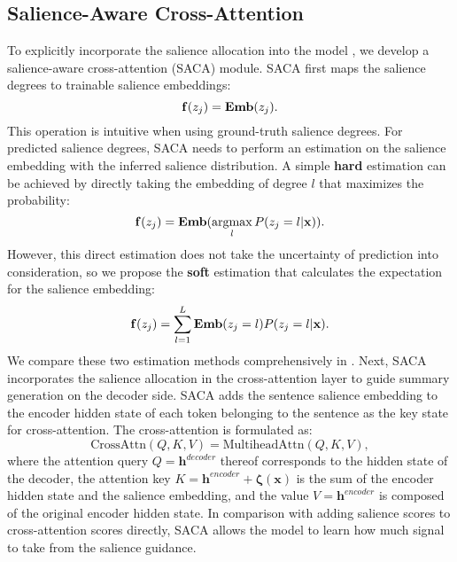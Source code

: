 \documentclass[11pt]{article}
\DeclareMathOperator*{\argmax}{argmax} \usepackage{pifont}
\begin{document}
\subsection{Salience-Aware Cross-Attention}
To explicitly incorporate the salience allocation into the model , we develop a salience-aware cross-attention (SACA) module.
SACA first maps the salience degrees to trainable salience embeddings:  \vspace{-1mm}
\begin{equation}
    \mathbf{f}(z_j) = \textbf{Emb}(z_j) .
    \vspace{-1mm}
\end{equation}
This operation is intuitive when using ground-truth salience degrees.
For predicted salience degrees, SACA needs to perform an estimation on the salience embedding with the inferred salience distribution.
A simple \textbf{hard} estimation can be achieved by
directly taking the embedding of degree $l$ that maximizes the probability:
\vspace{-1mm}
\begin{equation}
    \mathbf{f}(z_j) = \textbf{Emb}(\argmax_{l} P(z_j=l|\mathbf{x})) .
    \label{eq:function_f_hard}
    \vspace{-1mm}
\end{equation}
However, this direct estimation does not take the uncertainty of prediction into consideration, so we propose the \textbf{soft} estimation that calculates the expectation for the salience embedding:
\vspace{-1mm}
\begin{equation}
    \mathbf{f}(z_j) = \sum_{l=1}^{L}{\textbf{Emb}(z_j=l)P(z_j=l|\mathbf{x})} .
    \label{eq:function_f_soft}
    \vspace{-1mm}
\end{equation}
We compare these two estimation methods comprehensively in .
Next, SACA incorporates the salience allocation in the cross-attention layer to guide summary generation on the decoder side.
SACA adds the sentence salience embedding to the encoder hidden state of each token belonging to the sentence as the key state for cross-attention.
The cross-attention is formulated as:
\vspace{-1mm}
\begin{equation*}
\text{CrossAttn}(Q, K, V) = \text{MultiheadAttn}(Q, K, V) ,
\end{equation*}
where the attention query $Q = \textbf{h}^{decoder}$ thereof corresponds to the hidden state of the decoder, the attention key $K = \textbf{h}^{encoder} + \mathbf{\zeta}(\mathbf{x})$ is the sum of the encoder hidden state and the salience embedding, and
the value $V = \textbf{h}^{encoder}$ is composed of the original encoder hidden state.
In comparison with adding salience scores to cross-attention scores directly, SACA allows the model to learn how much signal to take from the salience guidance.
\end{document}
